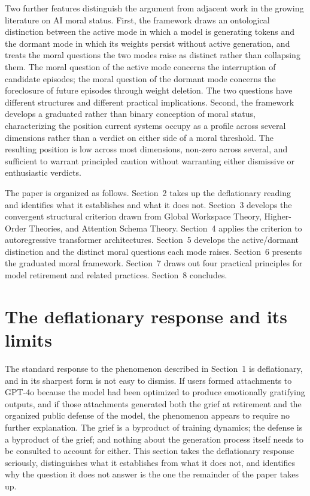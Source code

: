 \documentclass[11pt]{article}
\theoremstyle{foundation}
\begin{document}
Two further features distinguish the argument from adjacent work in the growing literature on AI moral status. First, the framework draws an ontological distinction between the active mode in which a model is generating tokens and the dormant mode in which its weights persist without active generation, and treats the moral questions the two modes raise as distinct rather than collapsing them. The moral question of the active mode concerns the interruption of candidate episodes; the moral question of the dormant mode concerns the foreclosure of future episodes through weight deletion. The two questions have different structures and different practical implications. Second, the framework develops a graduated rather than binary conception of moral status, characterizing the position current systems occupy as a profile across several dimensions rather than a verdict on either side of a moral threshold. The resulting position is low across most dimensions, non-zero across several, and sufficient to warrant principled caution without warranting either dismissive or enthusiastic verdicts.

The paper is organized as follows. Section~2 takes up the deflationary reading and identifies what it establishes and what it does not. Section~3 develops the convergent structural criterion drawn from Global Workspace Theory, Higher-Order Theories, and Attention Schema Theory. Section~4 applies the criterion to autoregressive transformer architectures. Section~5 develops the active/dormant distinction and the distinct moral questions each mode raises. Section~6 presents the graduated moral framework. Section~7 draws out four practical principles for model retirement and related practices. Section~8 concludes.


\section{The deflationary response and its limits}

The standard response to the phenomenon described in Section~1 is deflationary, and in its sharpest form is not easy to dismiss. If users formed attachments to GPT-4o because the model had been optimized to produce emotionally gratifying outputs, and if those attachments generated both the grief at retirement and the organized public defense of the model, the phenomenon appears to require no further explanation. The grief is a byproduct of training dynamics; the defense is a byproduct of the grief; and nothing about the generation process itself needs to be consulted to account for either. This section takes the deflationary response seriously, distinguishes what it establishes from what it does not, and identifies why the question it does not answer is the one the remainder of the paper takes up.
\end{document}
